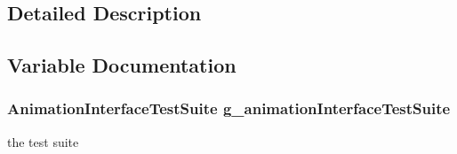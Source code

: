 \subsection{Detailed Description}


\subsection{Variable Documentation}
\subsubsection[{\texorpdfstring{g\+\_\+animation\+Interface\+Test\+Suite}{g_animationInterfaceTestSuite}}]{\setlength{\rightskip}{0pt plus 5cm} {\bf Animation\+Interface\+Test\+Suite}  g\+\_\+animation\+Interface\+Test\+Suite\hspace{0.3cm}{\ttfamily [static]}}\hypertarget{group__netanim-test_ga6c3e8c675de6bf21d861d7aba4a6b276}{}\label{group__netanim-test_ga6c3e8c675de6bf21d861d7aba4a6b276}


the test suite 


